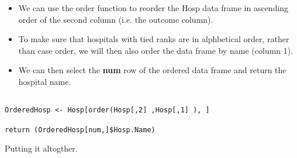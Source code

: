\documentclass[]{article}
\begin{document}
\begin{itemize}
\item We can use the order function to reorder the Hosp data frame in ascending order of the second column (i.e. the outcome column). 
\item To make sure that hospitals with tied ranks are in alphbetical order, rather than case order, we will then also order the data frame by name (column 1).

\item We can then select the \textbf{num} row of the ordered data frame and return the hospital name.
\end{itemize}
\begin{framed}
\begin{verbatim}

OrderedHosp <- Hosp[order(Hosp[,2] ,Hosp[,1] ), ]

return (OrderedHosp[num,]$Hosp.Name)
\end{verbatim}
\end{framed}

\newpage
Putting it altogther.
\end{document}
